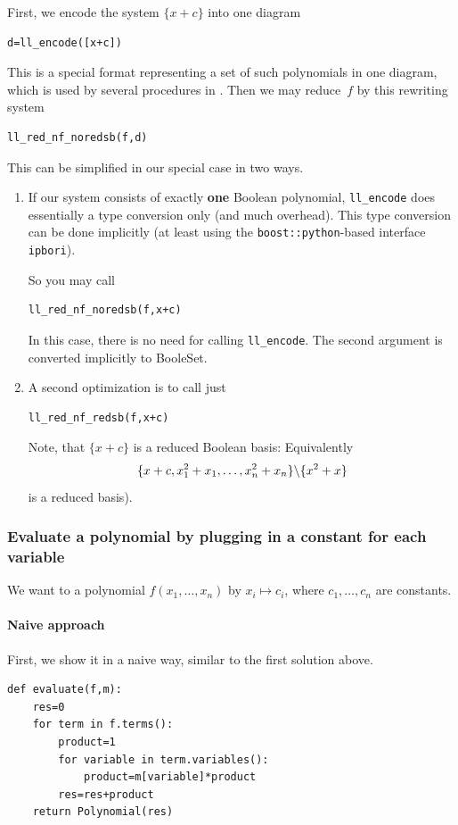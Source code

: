 First, we encode the system $\{x+c\}$ into one diagram
\begin{lstlisting}
d=ll_encode([x+c])    
\end{lstlisting}
%
This is a special format representing a set of such polynomials in one diagram, which is used by several procedures in
\PolyBoRi.
Then we may
reduce~$f$ by this rewriting system
\begin{lstlisting}
ll_red_nf_noredsb(f,d)  
\end{lstlisting}
%
%
This can be simplified in our special case in two ways.
\begin{enumerate}
    \item If our system consists of exactly \textbf{one} Boolean polynomial,
    \lstinline|ll_encode| does essentially  a type conversion only (and much overhead).
    This type conversion can be done implicitly (at least using the
\lstinline|boost::python|-based  interface \lstinline|ipbori|).

    So you may call
\begin{lstlisting}
ll_red_nf_noredsb(f,x+c)  
\end{lstlisting}
%
    In this case, there is no need for calling \lstinline|ll_encode|.
    The second argument is converted implicitly to BooleSet.
    \item A second optimization is to call just
\begin{lstlisting}
ll_red_nf_redsb(f,x+c)
\end{lstlisting}
    Note, that $\{x+c\}$ is a reduced Boolean \Groebner basis: Equivalently \[
        \{x+c,{x_1^2+x_1,\ldots,x_n^2+x_n}\}\backslash \{x^2+x\}
    \] is a reduced 
\Groebner 
basis).
\end{enumerate}



\subsubsection{Evaluate a polynomial by plugging in a constant for each variable}
    We want to a polynomial
    $f(x_1,\ldots, x_n)$
    by
    $x_i\mapsto c_i$, where
    $c_1,\ldots, c_n$ are constants.

\paragraph{Naive approach}
First, we show it in a naive way, similar to the first solution above.

\begin{lstlisting}
def evaluate(f,m):
    res=0
    for term in f.terms():
        product=1
        for variable in term.variables():
            product=m[variable]*product
        res=res+product
    return Polynomial(res)
\end{lstlisting}


